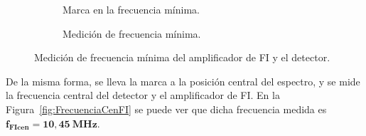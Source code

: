     \begin{figure}[H]
      \centering
      \begin{subfigure}[ht]{0.48\textwidth}
        \caption{Marca en la frecuencia mínima.}
        \label{fig:FrecuenciaMinFI_Osc}
      \end{subfigure}
      \hfill 
      \begin{subfigure}[ht]{0.48\textwidth}
        \caption{Medición de frecuencia mínima.}
        \label{fig:FrecuneciaMinFI_Gener}
      \end{subfigure}

      \caption{Medición de frecuencia mínima del amplificador de FI y el detector.}
      \label{fig:FrecuenciaMinFI}
    \end{figure}

    De la misma forma, se lleva la marca a la posición central del espectro, y se mide la frecuencia central 
    del detector y el amplificador de FI. En la Figura~\ref{fig:FrecuenciaCenFI} se puede ver que dicha 
    frecuencia medida es $\mathbf{f_{FIcen} = 10,45~MHz}$.

